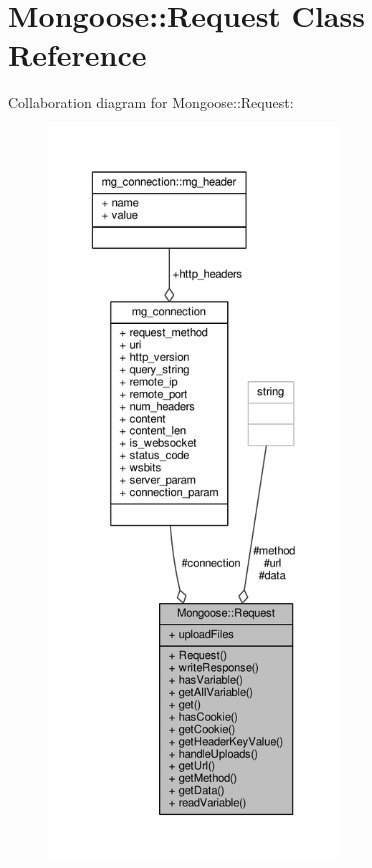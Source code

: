 \hypertarget{classMongoose_1_1Request}{}\section{Mongoose\+:\+:Request Class Reference}
\label{classMongoose_1_1Request}


Collaboration diagram for Mongoose\+:\+:Request\+:
\nopagebreak
\begin{figure}[H]
\begin{center}
\leavevmode
\includegraphics[height=550pt]{d6/d45/classMongoose_1_1Request__coll__graph}
\end{center}
\end{figure}

